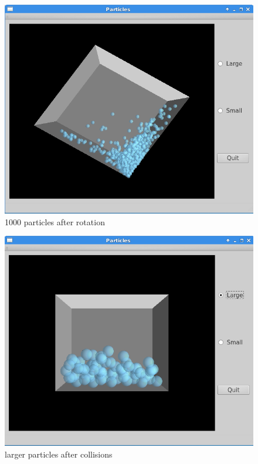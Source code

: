 \begin{figure}[h]
  \caption{1000 particles after rotation}
  \includegraphics[width=\columnwidth,natwidth=2in,natwidth=3in]{image3.png}
\end{figure}
\begin{figure}[h]
  \caption{larger particles after collisions}
  \includegraphics[width=\columnwidth,natwidth=2in,natwidth=3in]{image2.png}
\end{figure}
